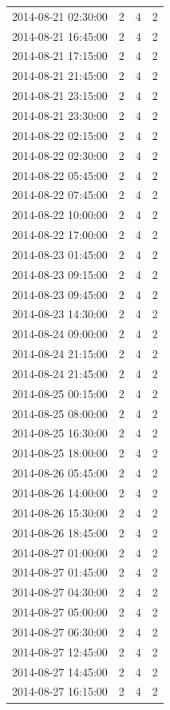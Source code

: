 \begin{tabular}{lrrr}
2014-08-21 02:30:00 & 2 & 4 & 2 \\
2014-08-21 16:45:00 & 2 & 4 & 2 \\
2014-08-21 17:15:00 & 2 & 4 & 2 \\
2014-08-21 21:45:00 & 2 & 4 & 2 \\
2014-08-21 23:15:00 & 2 & 4 & 2 \\
2014-08-21 23:30:00 & 2 & 4 & 2 \\
2014-08-22 02:15:00 & 2 & 4 & 2 \\
2014-08-22 02:30:00 & 2 & 4 & 2 \\
2014-08-22 05:45:00 & 2 & 4 & 2 \\
2014-08-22 07:45:00 & 2 & 4 & 2 \\
2014-08-22 10:00:00 & 2 & 4 & 2 \\
2014-08-22 17:00:00 & 2 & 4 & 2 \\
2014-08-23 01:45:00 & 2 & 4 & 2 \\
2014-08-23 09:15:00 & 2 & 4 & 2 \\
2014-08-23 09:45:00 & 2 & 4 & 2 \\
2014-08-23 14:30:00 & 2 & 4 & 2 \\
2014-08-24 09:00:00 & 2 & 4 & 2 \\
2014-08-24 21:15:00 & 2 & 4 & 2 \\
2014-08-24 21:45:00 & 2 & 4 & 2 \\
2014-08-25 00:15:00 & 2 & 4 & 2 \\
2014-08-25 08:00:00 & 2 & 4 & 2 \\
2014-08-25 16:30:00 & 2 & 4 & 2 \\
2014-08-25 18:00:00 & 2 & 4 & 2 \\
2014-08-26 05:45:00 & 2 & 4 & 2 \\
2014-08-26 14:00:00 & 2 & 4 & 2 \\
2014-08-26 15:30:00 & 2 & 4 & 2 \\
2014-08-26 18:45:00 & 2 & 4 & 2 \\
2014-08-27 01:00:00 & 2 & 4 & 2 \\
2014-08-27 01:45:00 & 2 & 4 & 2 \\
2014-08-27 04:30:00 & 2 & 4 & 2 \\
2014-08-27 05:00:00 & 2 & 4 & 2 \\
2014-08-27 06:30:00 & 2 & 4 & 2 \\
2014-08-27 12:45:00 & 2 & 4 & 2 \\
2014-08-27 14:45:00 & 2 & 4 & 2 \\
2014-08-27 16:15:00 & 2 & 4 & 2 \\

\end{tabular}
